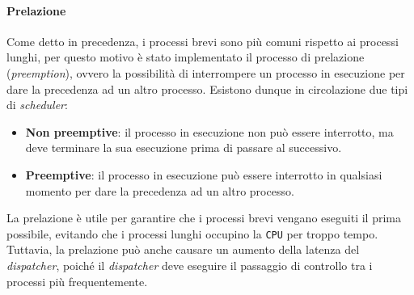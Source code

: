         \paragraph{Prelazione} Come detto in precedenza, i processi brevi sono più comuni rispetto ai processi lunghi, per questo motivo è stato implementato il processo di prelazione (\textit{preemption}), ovvero la possibilità di interrompere un processo in esecuzione per dare la precedenza ad un altro processo. Esistono dunque in circolazione due tipi di \textit{scheduler}:
        \begin{itemize}
            \item \textbf{Non preemptive}: il processo in esecuzione non può essere interrotto, ma deve terminare la sua esecuzione prima di passare al successivo.
            \item \textbf{Preemptive}: il processo in esecuzione può essere interrotto in qualsiasi momento per dare la precedenza ad un altro processo.
        \end{itemize}
        La prelazione è utile per garantire che i processi brevi vengano eseguiti il prima possibile, evitando che i processi lunghi occupino la \texttt{CPU} per troppo tempo. Tuttavia, la prelazione può anche causare un aumento della latenza del \textit{dispatcher}, poiché il \textit{dispatcher} deve eseguire il passaggio di controllo tra i processi più frequentemente.
